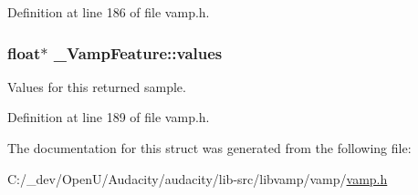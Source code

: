 Definition at line 186 of file vamp.\+h.

\subsubsection[{\texorpdfstring{values}{values}}]{\setlength{\rightskip}{0pt plus 5cm}float$\ast$ \+\_\+\+Vamp\+Feature\+::values}\hypertarget{struct___vamp_feature_ae4030f941ddb2bab8bc147b88e1f1c15}{}\label{struct___vamp_feature_ae4030f941ddb2bab8bc147b88e1f1c15}
Values for this returned sample. 

Definition at line 189 of file vamp.\+h.



The documentation for this struct was generated from the following file\+:\begin{DoxyCompactItemize}
\item 
C\+:/\+\_\+dev/\+Open\+U/\+Audacity/audacity/lib-\/src/libvamp/vamp/\hyperlink{vamp_8h}{vamp.\+h}\end{DoxyCompactItemize}
